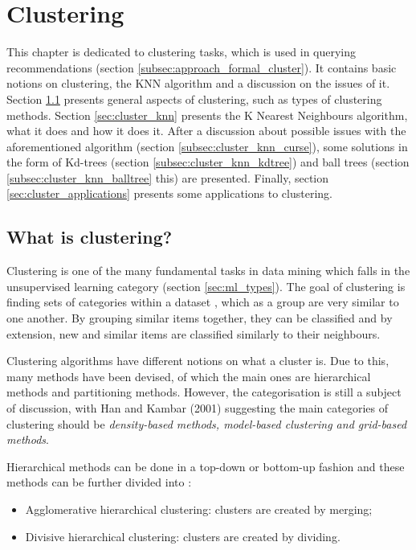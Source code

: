 \chapter{Clustering}
\label {chap:cluster}

This chapter is dedicated to clustering tasks, which is used in querying recommendations (section \ref{subsec:approach_formal_cluster}). It contains basic notions on clustering, the KNN algorithm and a discussion on the issues of it. Section \ref{sec:cluster_what} presents general aspects of clustering, such as types of clustering methods. Section \ref{sec:cluster_knn} presents the K Nearest Neighbours algorithm, what it does and how it does it. After a discussion about possible issues with the aforementioned algorithm (section \ref{subsec:cluster_knn_curse}), some solutions in the form of Kd-trees (section \ref{subsec:cluster_knn_kdtree}) and ball trees (section \ref{subsec:cluster_knn_balltree} this) are presented. Finally, section \ref{sec:cluster_applications} presents some applications to clustering.

\section{What is clustering?}
\label{sec:cluster_what}

Clustering is one of the many fundamental tasks in data mining which falls in the unsupervised learning category (section \ref{sec:ml_types}). The goal of clustering is finding sets of categories within a dataset \cite{clustering}, which as a group are very similar to one another. By grouping similar items together, they can be classified and by extension, new and similar items are classified similarly to their neighbours.

Clustering algorithms have different notions on what a cluster is. Due to this, many methods have been devised, of which the main ones are hierarchical methods and partitioning methods. However, the categorisation is still a subject of discussion, with Han and Kambar (2001) suggesting the main categories of clustering should be \textit{density-based methods, model-based clustering and grid-based methods}.

Hierarchical methods can be done in a top-down or bottom-up fashion and these methods can be further divided into \cite{clustering}:

\begin{itemize}
\item{Agglomerative hierarchical clustering: clusters are created by merging;}
\item{Divisive hierarchical clustering: clusters are created by dividing.}
\end{itemize} 


